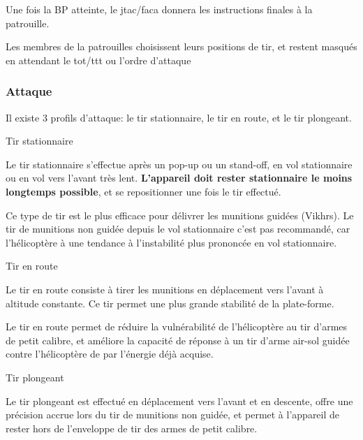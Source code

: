 \e
    \item Une fois la BP atteinte, le \gls{jtac}/\gls{faca} donnera les instructions finales à la patrouille.
    \item Les membres de la patrouilles choisissent leurs positions de tir, et restent masqués en attendant le \gls{tot}/\gls{ttt} ou l'ordre d'attaque
\ed

\subsubsection{Attaque}

\e
    \item Il existe 3 profils d'attaque: le tir stationnaire, le tir en route, et le tir plongeant.


	\item Tir stationnaire

	\e
	    \item
	    Le tir stationnaire s'effectue après un pop-up ou un stand-off, en vol stationnaire ou en vol vers l'avant très lent. \textbf{L'appareil doit rester stationnaire le moins longtemps possible}, et se repositionner une fois le tir effectué.
	    \item
	    Ce type de tir est le plus efficace pour délivrer les munitions guidées (Vikhrs). Le tir de munitions non guidée depuis le vol stationnaire c'est pas recommandé, car l'hélicoptère à une tendance à l'instabilité plus prononcée en vol stationnaire.
	\ed

	\item Tir en route

	\e
	    \item Le tir en route consiste à tirer les munitions en déplacement vers l'avant à altitude constante. Ce tir permet une plus grande stabilité de la plate-forme.
	    \item
	    Le tir en route permet de réduire la vulnérabilité de l'hélicoptère au tir d'armes de petit calibre, et améliore la capacité de réponse à un tir d'arme air-sol guidée contre l'hélicoptère de par l'énergie déjà acquise.
	\ed

	\item Tir plongeant

	\e
	    \item
	    Le tir plongeant est effectué en déplacement vers l'avant et en descente, offre une précision accrue lors du tir de munitions non guidée, et permet à l'appareil de rester hors de l'enveloppe de tir des armes de petit calibre.
	
